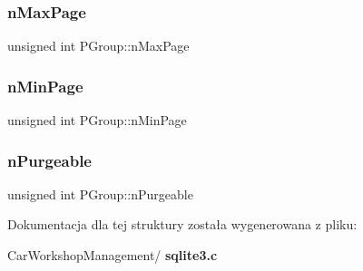 \mbox{\label{struct_p_group_a219ff89d38529cbb6b47e60f41896f41}} 
\subsubsection{nMaxPage}
{\footnotesize\ttfamily unsigned int P\+Group\+::n\+Max\+Page}

\mbox{\label{struct_p_group_aedf84324cb7138c9f9ee31814e8274c0}} 
\subsubsection{nMinPage}
{\footnotesize\ttfamily unsigned int P\+Group\+::n\+Min\+Page}

\mbox{\label{struct_p_group_a180305522a33fda4ce76dd133c29fd6a}} 
\subsubsection{nPurgeable}
{\footnotesize\ttfamily unsigned int P\+Group\+::n\+Purgeable}



Dokumentacja dla tej struktury została wygenerowana z pliku\+:\begin{DoxyCompactItemize}
\item 
Car\+Workshop\+Management/\textbf{ sqlite3.\+c}\end{DoxyCompactItemize}
